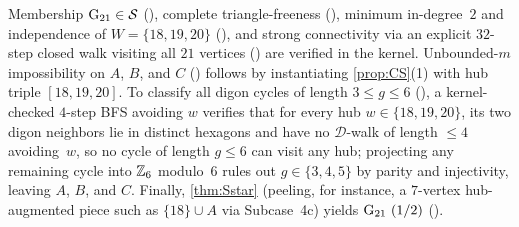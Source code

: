 \begin{outline}
Membership $\mathrm{G}_{21} \in \mathcal{S}$ (), complete triangle-freeness (), minimum
in-degree~$2$ and independence of $W = \{18,19,20\}$ (), and strong connectivity via an
explicit $32$-step closed walk visiting all $21$ vertices () are verified in the kernel.
Unbounded-$m$ impossibility on $A$, $B$, and $C$ () follows by instantiating \cref{prop:CS}(1)
with hub triple $[18, 19, 20]$. To classify all digon cycles of length $3 \le g \le 6$ (),
a kernel-checked $4$-step BFS avoiding $w$ verifies that for every hub $w \in \{18,19,20\}$, its two digon neighbors lie in
distinct hexagons and have no $\mathcal{D}$-walk of length $\le 4$ avoiding~$w$, so no cycle of length $g \le 6$ can visit
any hub; projecting any remaining cycle into $\mathbb{Z}_6$ modulo~$6$ rules out $g \in \{3, 4, 5\}$ by parity and injectivity,
leaving $A$, $B$, and $C$. Finally, \cref{thm:Sstar} (peeling, for instance, a $7$-vertex hub-augmented piece such as
$\{18\} \cup A$ via Subcase~4c) yields  $\mathrm{G}_{21}\ (1/2)$ ().
\end{outline}
